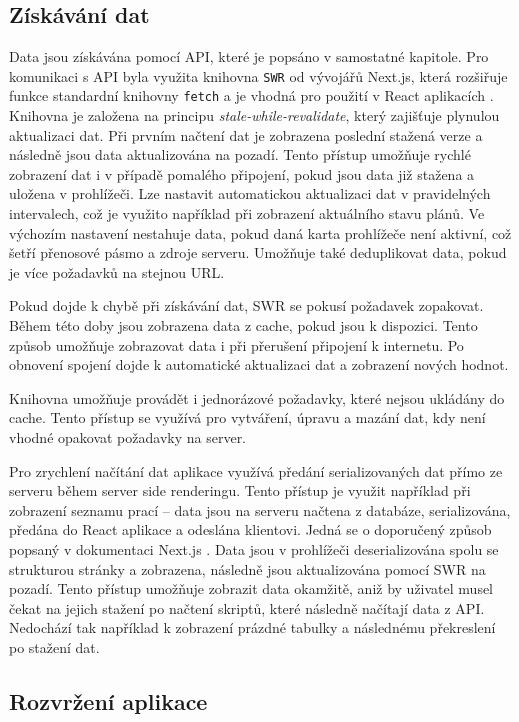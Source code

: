 \subsection{Získávání dat}

Data jsou získávána pomocí API, které je popsáno v samostatné kapitole. Pro komunikaci s API byla využita knihovna \texttt{SWR} od vývojářů Next.js, která
rozšiřuje funkce standardní knihovny \texttt{fetch} a je vhodná pro použití v React aplikacích \cite{swr}. Knihovna je založena na principu \textit{stale-while-revalidate},
který zajišťuje plynulou aktualizaci dat. Při prvním načtení dat je zobrazena poslední stažená verze a následně jsou data aktualizována na pozadí. Tento přístup
umožňuje rychlé zobrazení dat i v případě pomalého připojení, pokud jsou data již stažena a uložena v prohlížeči. Lze nastavit automatickou aktualizaci dat 
v pravidelných intervalech, což je využito například při zobrazení aktuálního stavu plánů. Ve výchozím nastavení nestahuje data, pokud daná karta prohlížeče není
aktivní, což šetří přenosové pásmo a zdroje serveru. Umožňuje také deduplikovat data, pokud je více požadavků na stejnou URL.

Pokud dojde k chybě při získávání dat, SWR se pokusí požadavek zopakovat. Během této doby jsou zobrazena data z cache, pokud jsou k dispozici. Tento způsob
umožňuje zobrazovat data i při přerušení připojení k internetu. Po obnovení spojení dojde k automatické aktualizaci dat a zobrazení nových hodnot.

Knihovna umožňuje provádět i jednorázové požadavky, které nejsou ukládány do cache. Tento přístup se využívá pro vytváření, úpravu a mazání dat, kdy není vhodné
opakovat požadavky na server.

Pro zrychlení načítání dat aplikace využívá předání serializovaných dat přímo ze serveru během server side renderingu. Tento přístup je využit například při
zobrazení seznamu prací -- data jsou na serveru načtena z databáze, serializována, předána do React aplikace a odeslána klientovi.
Jedná se o doporučený způsob popsaný v dokumentaci Next.js \cite{nextjs_data}.
Data jsou v prohlížeči deserializována spolu se strukturou stránky a zobrazena, následně jsou aktualizována pomocí SWR na pozadí. Tento přístup umožňuje zobrazit data okamžitě, aniž by
uživatel musel čekat na jejich stažení po načtení skriptů, které následně načítají data z API.
Nedochází tak například k zobrazení prázdné tabulky a následnému překreslení po stažení dat.

\subsection{Rozvržení aplikace}

